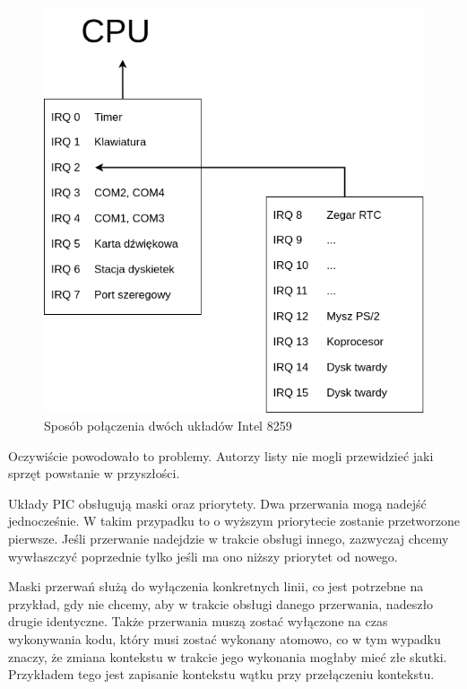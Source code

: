 \documentclass[shortabstract,inz]{iithesis}
\begin{document}
\begin{figure}
  \begin{center}
    \includegraphics[width=\linewidth/2]{pic}
    \caption{Sposób połączenia dwóch układów Intel 8259}
  \end{center}
\end{figure}

Oczywiście powodowało to problemy. Autorzy listy nie mogli przewidzieć jaki
sprzęt powstanie w przyszłości. 

Układy PIC obsługują maski oraz priorytety. Dwa przerwania mogą nadejść
jednocześnie. W takim przypadku to o wyższym priorytecie zostanie przetworzone
pierwsze. 
Jeśli przerwanie nadejdzie w trakcie obsługi innego, zazwyczaj chcemy
wywłaszczyć poprzednie tylko jeśli ma ono niższy priorytet od nowego. 

Maski przerwań służą do wyłączenia konkretnych linii, co jest potrzebne na przykład,
gdy nie chcemy, aby w trakcie obsługi danego przerwania, nadeszło drugie
identyczne. Także przerwania muszą zostać wyłączone na czas wykonywania kodu,
który musi zostać wykonany atomowo, co w tym wypadku znaczy, że zmiana
kontekstu w trakcie jego wykonania mogłaby mieć złe skutki.
Przykładem tego jest zapisanie kontekstu wątku przy przełączeniu kontekstu.
\end{document}
